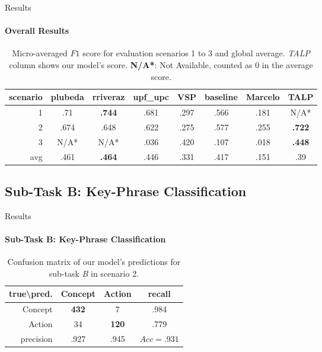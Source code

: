 \documentclass{beamer}
\begin{document}
\begin{frame}{Results}
\framesubtitle{Overall Results}
    \begin{table}[ht]
    \footnotesize
    \centering
\begin{tabular}{r|cccccc|c}
\toprule
{\footnotesize{scenario}} & {\footnotesize{plubeda}} & {\footnotesize{rriveraz}} & {\footnotesize{upf\_upc}} & {\footnotesize{VSP}} & {\footnotesize{baseline}} & {\footnotesize{Marcelo}} & {\footnotesize{TALP}} \\
\midrule
1 & .71 & \textbf{.744} & .681 & .297 & .566 & .181 & {\footnotesize{N/A*}} \\
2 & .674 & .648 & .622 & .275 & .577 & .255 & \textbf{.722} \\
3 & {\scriptsize{N/A*}} & {\scriptsize{N/A*}} & .036 & .420 & .107 & .018 & \textbf{.448} \\
\bottomrule
avg & .461 & \textbf{.464} & .446 & .331 & .417 & .151 & .39 \\
\end{tabular}
    \caption{Micro-averaged $F1$ score for evaluation scenarios 1 to 3 and global average. \emph{TALP} column shows our model's score. \textbf{N/A*}: Not Available, counted as 0 in the average score.}
    \label{tab:results}
\end{table}
\end{frame}

\subsection{Sub-Task B: Key-Phrase Classification}

\begin{frame}{Results}
\framesubtitle{Sub-Task B: Key-Phrase Classification}
    \begin{table}[t]
 \footnotesize
    \centering
\begin{tabular}{r|cc|c}
\toprule
true\textbackslash pred. & Concept &  Action & recall \\
\midrule
Concept &  \textbf{432} &       7 &  .984\\
Action  &   34 &     \textbf{120} & .779\\
\bottomrule
precision & .927 & .945 & $Acc=.931$


\end{tabular}
    \caption{Confusion matrix of our model's predictions for sub-task \emph{B} in scenario 2.}
    \label{tab:confusion2a}
\end{table}
\end{frame}
\end{document}

